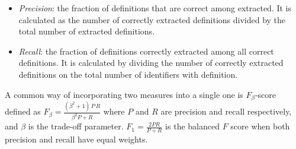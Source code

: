 \begin{itemize}
\itemsep1pt\parskip0pt
  \item \emph{Precision}: the fraction of definitions that are correct among extracted. 
        It is calculated as the number of correctly extracted definitions
        divided by the total number of extracted definitions. 
  \item \emph{Recall}: the fraction of definitions correctly extracted among all correct
        definitions. 
        It is calculated by dividing the number of correctly extracted definitions
        on the total number of identifiers with definition.
\end{itemize}


A common way of incorporating two measures into a single one is $F_\beta$-score
defined as $F_\beta = \frac{(\beta^2 +1)\, P \, R}{\beta^2 P + R}$ where 
$P$ and $R$ are precision and recall respectively, and $\beta$ is the trade-off
parameter. $F_1 = \frac{2PR}{P + R}$ is the balanced $F$ score when both 
precision and recall have equal weights.